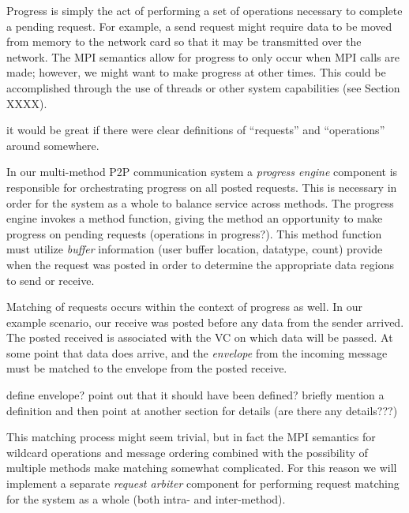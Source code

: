 Progress is simply the act of performing a set of operations necessary to
complete a pending request.  For example, a send request might require data to
be moved from memory to the network card so that it may be transmitted over the
network.
%
The MPI semantics allow for progress to only occur when MPI calls
are made; however, we might want to make progress at other times.  This could
be accomplished through the use of threads or other system capabilities (see
Section XXXX).

\begin{cmt}
  it would be great if there were clear definitions of ``requests'' and
  ``operations'' around somewhere.
\end{cmt}

In our multi-method P2P communication system a \emph{progress engine} component
is responsible for orchestrating progress on all posted requests.  This is
necessary in order for the system as a whole to balance service across methods.
The progress engine invokes a method function, giving the method an opportunity
to make progress on pending requests (operations in progress?).  This method
function must utilize \emph{buffer} information (user buffer location,
datatype, count) provide when the request was posted in order to determine the
appropriate data regions to send or receive.

Matching of requests occurs within the context of progress as well.  In our
example scenario, our receive was posted before any data from the sender
arrived.  The posted received is associated with the VC on which data will be
passed.  At some point that data does arrive, and the \emph{envelope} from
the incoming message must be matched to the envelope from the posted receive.

\begin{cmt}
  define envelope?  point out that it should have been defined?  briefly
  mention a definition and then point at another section for details (are there
  any details???)
\end{cmt}

This matching process might seem trivial, but in fact the MPI semantics for
wildcard operations and message ordering combined with the possibility of
multiple methods make matching somewhat complicated.
For this reason we will implement a separate \emph{request arbiter}
component for performing request matching for the
system as a whole (both intra- and inter-method).

% 

